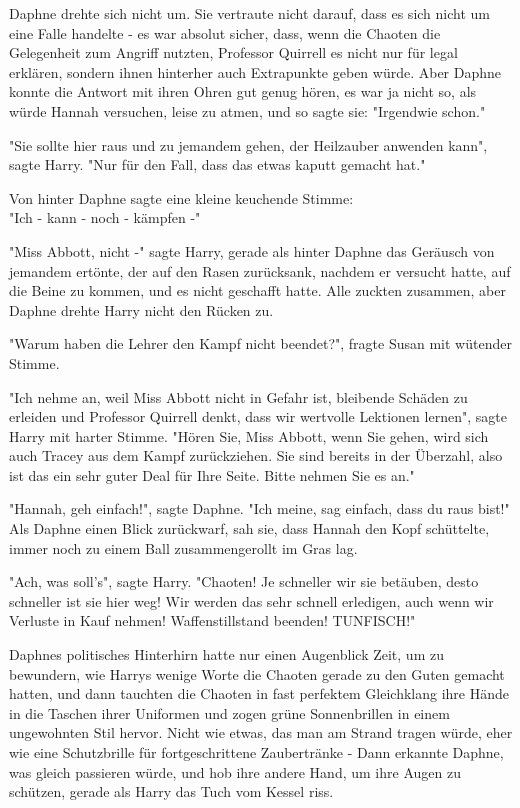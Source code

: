 {Daphne drehte sich nicht um. Sie vertraute nicht darauf, dass es sich nicht um eine Falle handelte - es war absolut sicher, dass, wenn die Chaoten die Gelegenheit zum Angriff nutzten, Professor Quirrell es nicht nur für legal erklären, sondern ihnen hinterher auch Extrapunkte geben würde. Aber Daphne konnte die Antwort mit ihren Ohren gut genug hören, es war ja nicht so, als würde Hannah versuchen, leise zu atmen, und so sagte sie: "Irgendwie schon."

"Sie sollte hier raus und zu jemandem gehen, der Heilzauber anwenden kann", sagte Harry. "Nur für den Fall, dass das etwas kaputt gemacht hat."

Von hinter Daphne sagte eine kleine keuchende Stimme:\\ "Ich - kann - noch - kämpfen -"

"Miss Abbott, nicht -" sagte Harry, gerade als hinter Daphne das Geräusch von jemandem ertönte, der auf den Rasen zurücksank, nachdem er versucht hatte, auf die Beine zu kommen, und es nicht geschafft hatte. Alle zuckten zusammen, aber Daphne drehte Harry nicht den Rücken zu.

"Warum haben die Lehrer den Kampf nicht beendet?", fragte Susan mit wütender Stimme.

"Ich nehme an, weil Miss Abbott nicht in Gefahr ist, bleibende Schäden zu erleiden und Professor Quirrell denkt, dass wir wertvolle Lektionen lernen", sagte Harry mit harter Stimme. "Hören Sie, Miss Abbott, wenn Sie gehen, wird sich auch Tracey aus dem Kampf zurückziehen. Sie sind bereits in der Überzahl, also ist das ein sehr guter Deal für Ihre Seite. Bitte nehmen Sie es an."

"Hannah, geh einfach!", sagte Daphne. "Ich meine, sag einfach, dass du raus bist!" Als Daphne einen Blick zurückwarf, sah sie, dass Hannah den Kopf schüttelte, immer noch zu einem Ball zusammengerollt im Gras lag.

"Ach, was soll's", sagte Harry. "Chaoten! Je schneller wir sie betäuben, desto schneller ist sie hier weg! Wir werden das sehr schnell erledigen, auch wenn wir Verluste in Kauf nehmen! Waffenstillstand beenden! TUNFISCH!"

Daphnes politisches Hinterhirn hatte nur einen Augenblick Zeit, um zu bewundern, wie Harrys wenige Worte die Chaoten gerade zu den Guten gemacht hatten, und dann tauchten die Chaoten in fast perfektem Gleichklang ihre Hände in die Taschen ihrer Uniformen und zogen grüne Sonnenbrillen in einem ungewohnten Stil hervor. Nicht wie etwas, das man am Strand tragen würde, eher wie eine Schutzbrille für fortgeschrittene Zaubertränke - Dann erkannte Daphne, was gleich passieren würde, und hob ihre andere Hand, um ihre Augen zu schützen, gerade als Harry das Tuch vom Kessel riss.

}
